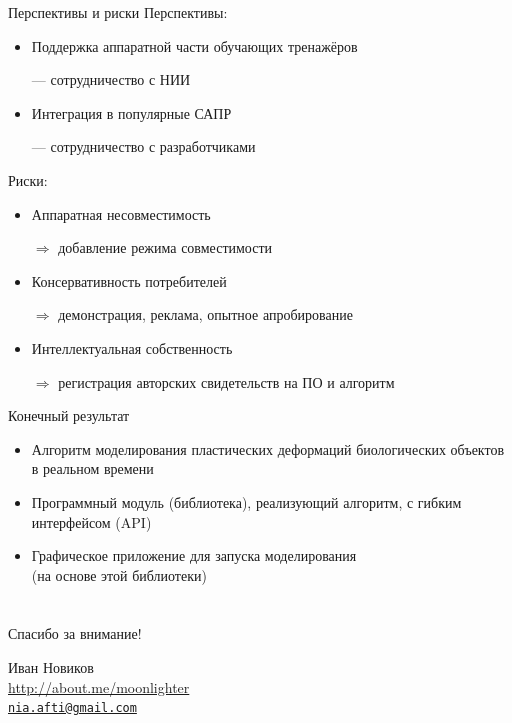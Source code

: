 \documentclass[usenames,dvipsnames,pdftex,unicode,hidelinks]{beamer}
\begin{document}
  \begin{frame}{Перспективы и риски}
    Перспективы:
    \begin{itemize}
      \item Поддержка аппаратной части обучающих тренажёров
        \par{
          \scriptsize
          --- сотрудничество с НИИ
        }
      \item Интеграция в популярные САПР
        \par{
          \scriptsize
          --- сотрудничество с разработчиками
        }
    \end{itemize}

    Риски:
    \begin{itemize}
      \item Аппаратная несовместимость
        \par{
          \scriptsize
          $\Longrightarrow$ добавление режима совместимости
        }
      \item Консервативность потребителей
        \par{
          \scriptsize
          $\Longrightarrow$ демонстрация, реклама, опытное апробирование
        }
      \item Интеллектуальная собственность
        \par{
          \scriptsize
          $\Longrightarrow$ регистрация авторских свидетельств на ПО и алгоритм
        }
    \end{itemize}
  \end{frame}

  \begin{frame}{Конечный результат}
    \begin{itemize}
      \setlength{\itemsep}{5mm}
      \item Алгоритм моделирования пластических деформаций биологических объектов в
        реальном времени
      \item Программный модуль (библиотека), реализующий алгоритм, с гибким интерфейсом (API)
      \item Графическое приложение для запуска моделирования \\(на основе этой библиотеки)
    \end{itemize}
  \end{frame}


  \section{}

  \begin{frame}[plain]
    \begin{center}
      { \Huge Спасибо за внимание! }

      \vspace{1cm}

      Иван Новиков\\
      \url{http://about.me/moonlighter}\\
      \href{mailto:nia.afti@gmail.com}{\nolinkurl{nia.afti@gmail.com} }
      
    \end{center}
  \end{frame}
\end{document}

